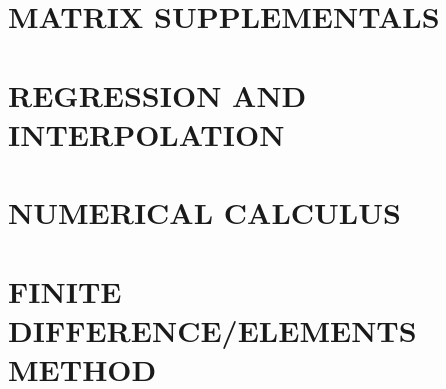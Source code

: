 \documentclass{book}
\begin{document}
\section{MATRIX SUPPLEMENTALS}





\section{REGRESSION AND INTERPOLATION}









\section{NUMERICAL CALCULUS}























\section{FINITE DIFFERENCE/ELEMENTS METHOD}









%

%

%

%


\end{document}
